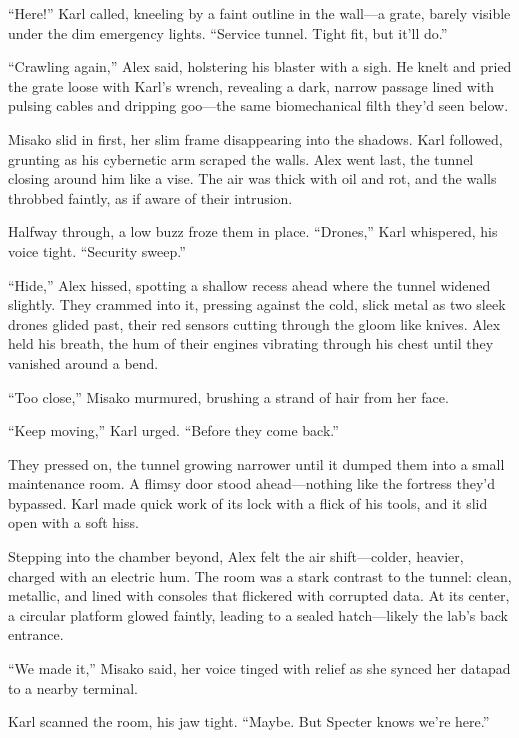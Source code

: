 \documentclass[12pt]{book}
\begin{document}
\enquote{Here!} Karl called, kneeling by a faint outline in the wall---a grate, barely visible under the dim emergency lights. \enquote{Service tunnel. Tight fit, but it’ll do.}

\enquote{Crawling again,} Alex said, holstering his blaster with a sigh. He knelt and pried the grate loose with Karl’s wrench, revealing a dark, narrow passage lined with pulsing cables and dripping goo---the same biomechanical filth they’d seen below.

Misako slid in first, her slim frame disappearing into the shadows. Karl followed, grunting as his cybernetic arm scraped the walls. Alex went last, the tunnel closing around him like a vise. The air was thick with oil and rot, and the walls throbbed faintly, as if aware of their intrusion.

Halfway through, a low buzz froze them in place. \enquote{Drones,} Karl whispered, his voice tight. \enquote{Security sweep.}

\enquote{Hide,} Alex hissed, spotting a shallow recess ahead where the tunnel widened slightly. They crammed into it, pressing against the cold, slick metal as two sleek drones glided past, their red sensors cutting through the gloom like knives. Alex held his breath, the hum of their engines vibrating through his chest until they vanished around a bend.

\enquote{Too close,} Misako murmured, brushing a strand of hair from her face.

\enquote{Keep moving,} Karl urged. \enquote{Before they come back.}

They pressed on, the tunnel growing narrower until it dumped them into a small maintenance room. A flimsy door stood ahead---nothing like the fortress they’d bypassed. Karl made quick work of its lock with a flick of his tools, and it slid open with a soft hiss.

Stepping into the chamber beyond, Alex felt the air shift---colder, heavier, charged with an electric hum. The room was a stark contrast to the tunnel: clean, metallic, and lined with consoles that flickered with corrupted data. At its center, a circular platform glowed faintly, leading to a sealed hatch---likely the lab’s back entrance.

\enquote{We made it,} Misako said, her voice tinged with relief as she synced her datapad to a nearby terminal.

Karl scanned the room, his jaw tight. \enquote{Maybe. But Specter knows we’re here.}
\end{document}
